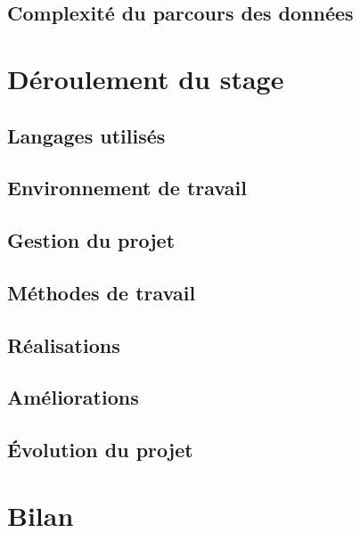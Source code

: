 \documentclass[12pt,french,a4paper, oneside,openright]{report}
\begin{document}
\section{Complexité du parcours des données}


\newpage
\chapter{Déroulement du stage}
\section{Langages utilisés}

\section{Environnement de travail}

\section{Gestion du projet}

\section{Méthodes de travail}

\section{Réalisations}

\section{Améliorations}

\section{Évolution du projet}


\chapter{Bilan}


\newpage
\ 
\newpage


\printbibliography[heading=bibintoc]

\tableofcontents
\newpage
\ 
\newpage
\listoffigures
\newpage
\ 
\newpage
\listoftables
\newpage
\ 
\newpage
\lstlistoflistings
\end{document}
